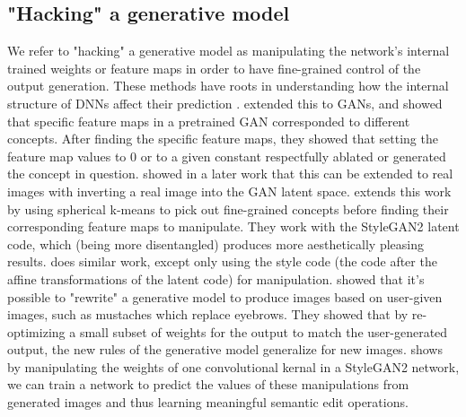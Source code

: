 \subsection{"Hacking" a generative model}\label{subsection:hacking_generative_model}
We refer to "hacking" a generative model as manipulating the network's internal trained weights 
or feature maps in order to have fine-grained control of the output generation. These methods 
have roots in understanding how the internal structure of \ac{DNN}s affect their prediction \citep{collins2018deep, zeiler2014visualizing, strobelt2017lstmvis, karpathy2015visualizing, chen2019delving}.
\cite{bau2018gan} extended this to \ac{GAN}s, and showed that specific feature maps in a pretrained \ac{GAN}
corresponded to different concepts. After finding the specific feature maps, they showed that setting 
the feature map values to 0 or to a given constant respectfully ablated or generated the concept 
in question. \cite{bau2020semantic} showed in a later work that this can be extended to real images 
with inverting a real image into the \ac{GAN} latent space. \cite{editing_style} extends this work 
by using spherical k-means to pick out fine-grained concepts before finding their corresponding feature maps 
to manipulate. They work with the StyleGAN2 latent code, which (being more disentangled) produces more 
aesthetically pleasing results. \cite{stylespace_analysis} does similar work, except only using the 
style code (the code after the affine transformations of the latent code) for manipulation. \cite{bau2020rewriting} 
showed that it's possible 
to "rewrite" a generative model to produce images based on user-given images, such as mustaches which 
replace eyebrows. They showed that by re-optimizing a small subset of weights for the output to match 
the user-generated output, the new rules of the generative model generalize for new images. 
\cite{cherepkov2021navigating} shows by manipulating the weights of one convolutional kernal in a 
StyleGAN2 network, we can train a network to predict the values of these manipulations from generated images 
and thus learning meaningful semantic edit operations. 

